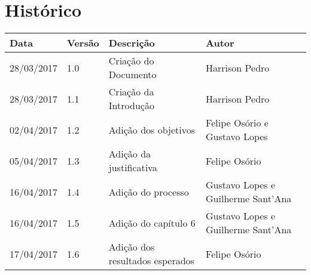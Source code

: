 \chapter{Histórico}

\begin{tabular}{ |p{3cm}|p{3cm}|p{3cm}|p{3cm}|  }
 \hline
 Data 		& 		Versão & 		Descrição 			& 		Autor\\
 \hline\hline
 28/03/2017 & 		1.0    &		Criação do Documento &   	Harrison Pedro	  \\
 \hline
 28/03/2017 & 		1.1    &		Criação da Introdução &   	Harrison Pedro	  \\
 \hline
 02/04/2017 & 		1.2    &		Adição dos objetivos &   	Felipe Osório e Gustavo Lopes	  \\
 \hline
 05/04/2017 & 		1.3    &		Adição da justificativa &   Felipe Osório	  \\
 \hline
 16/04/2017 & 		1.4    &		Adição do processo &   Gustavo Lopes e Guilherme Sant'Ana	  \\
 \hline
 16/04/2017 & 		1.5    &		Adição do capítulo 6 &   Gustavo Lopes e Guilherme Sant'Ana	  \\
 \hline
 17/04/2017 & 		1.6    &		Adição dos resultados esperados &   Felipe Osório	  \\
 \hline
\end{tabular}

